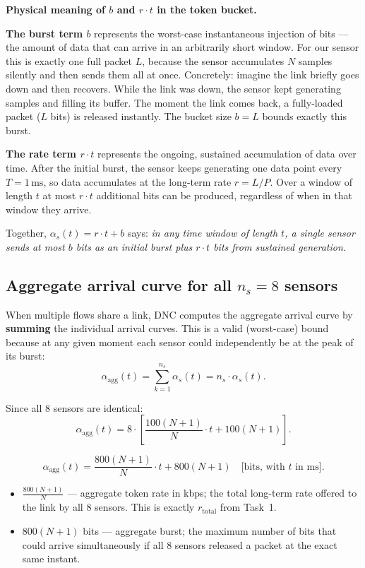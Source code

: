 \documentclass[12pt, a4paper]{article}
\begin{document}
\begin{notebox}
  \textbf{Physical meaning of $b$ and $r \cdot t$ in the token bucket.}

  \textbf{The burst term $b$} represents the worst-case instantaneous injection
  of bits --- the amount of data that can arrive in an arbitrarily short window.
  For our sensor this is exactly one full packet $L$, because the sensor
  accumulates $N$ samples silently and then sends them all at once.
  Concretely: imagine the link briefly goes down and then recovers.
  While the link was down, the sensor kept generating samples and filling its
  buffer. The moment the link comes back, a fully-loaded packet ($L$ bits) is
  released instantly. The bucket size $b = L$ bounds exactly this burst.

  \textbf{The rate term $r \cdot t$} represents the ongoing, sustained
  accumulation of data over time. After the initial burst, the sensor keeps
  generating one data point every $T = 1\,\mathrm{ms}$, so data accumulates
  at the long-term rate $r = L/P$. Over a window of length $t$ at most
  $r \cdot t$ additional bits can be produced, regardless of when in that
  window they arrive.

  Together, $\alpha_s(t) = r \cdot t + b$ says: \emph{in any time window of
  length $t$, a single sensor sends at most $b$ bits as an initial burst plus
  $r \cdot t$ bits from sustained generation.}
\end{notebox}

\subsection*{Aggregate arrival curve for all $n_s = 8$ sensors}

When multiple flows share a link, DNC computes the aggregate arrival curve by
\textbf{summing} the individual arrival curves. This is a valid (worst-case)
bound because at any given moment each sensor could independently be at the
peak of its burst:
\[
  \alpha_\text{agg}(t) = \sum_{k=1}^{n_s} \alpha_s(t) = n_s \cdot \alpha_s(t).
\]

Since all 8 sensors are identical:
\[
  \alpha_\text{agg}(t) = 8 \cdot \left[\frac{100(N+1)}{N}\cdot t + 100(N+1)\right].
\]

\[
  \boxed{\alpha_\text{agg}(t) = \frac{800(N+1)}{N}\cdot t + 800(N+1)
  \quad \text{[bits, with $t$ in ms]}.}
\]
\begin{itemize}[leftmargin=1.4em, itemsep=2pt]
  \item $\frac{800(N+1)}{N}$ --- aggregate token rate in kbps; the total
    long-term rate offered to the link by all 8 sensors. This is exactly
    $r_\text{total}$ from Task~1.
  \item $800(N+1)$ bits --- aggregate burst; the maximum number of bits that
    could arrive simultaneously if all 8 sensors released a packet at the
    exact same instant.
\end{itemize}
\end{document}
